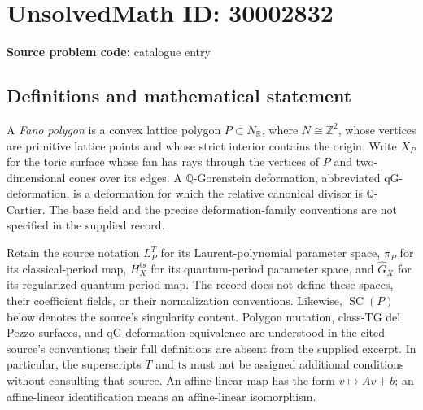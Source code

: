 \documentclass[11pt]{article}
\newcommand{\Z}{\mathbb{Z}}
\newcommand{\Q}{\mathbb{Q}}
\newcommand{\R}{\mathbb{R}}
\begin{document}
\section*{UnsolvedMath ID: 30002832}
\textbf{Source problem code:} catalogue entry
\subsection{Definitions and mathematical statement}
A \emph{Fano polygon} is a convex lattice polygon \(P\subset N_{\R}\), where \(N\cong\Z^2\), whose vertices are primitive lattice points and whose strict interior contains the origin. Write \(X_P\) for the toric surface whose fan has rays through the vertices of \(P\) and two-dimensional cones over its edges. A \(\Q\)-Gorenstein deformation, abbreviated qG-deformation, is a deformation for which the relative canonical divisor is \(\Q\)-Cartier. The base field and the precise deformation-family conventions are not specified in the supplied record.

Retain the source notation \(L_P^T\) for its Laurent-polynomial parameter space, \(\pi_P\) for its classical-period map, \(H_X^{\mathrm{ts}}\) for its quantum-period parameter space, and \(\widehat G_X\) for its regularized quantum-period map. The record does not define these spaces, their coefficient fields, or their normalization conventions. Likewise, \(\operatorname{SC}(P)\) below denotes the source's singularity content. Polygon mutation, class-TG del Pezzo surfaces, and qG-deformation equivalence are understood in the cited source's conventions; their full definitions are absent from the supplied excerpt. In particular, the superscripts \(T\) and \(\mathrm{ts}\) must not be assigned additional conditions without consulting that source. An affine-linear map has the form \(v\mapsto Av+b\); an affine-linear identification means an affine-linear isomorphism.
\end{document}
